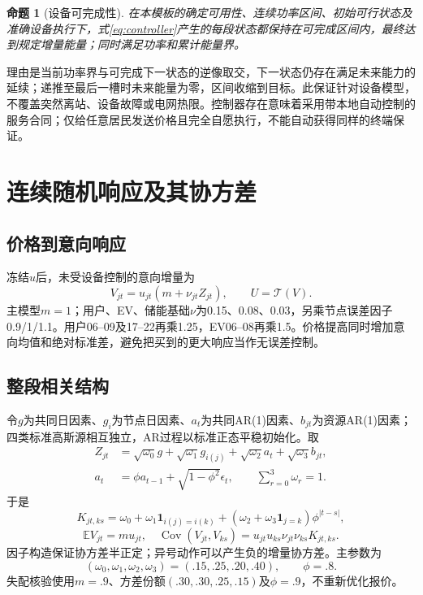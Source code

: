 \documentclass[UTF8,a4paper,11pt]{ctexart}
\newcommand{\E}{\mathbb E}\newcommand{\Prb}{\mathbb P}\newcommand{\R}{\mathbb R}
\newcommand{\Tcal}{\mathcal T}\newcommand{\ind}{\mathbf 1}
\newtheorem{proposition}{命题}
\begin{document}
\begin{proposition}[设备可完成性]
在本模板的确定可用性、连续功率区间、初始可行状态及准确设备执行下，式\eqref{eq:controller}产生的每段状态都保持在可完成区间内，最终达到规定增量能量；同时满足功率和累计能量界。
\end{proposition}
理由是当前功率界与可完成下一状态的逆像取交，下一状态仍存在满足未来能力的延续；递推至最后一槽时未来能量为零，区间收缩到目标。此保证针对设备模型，不覆盖突然离站、设备故障或电网热限。控制器存在意味着采用带本地自动控制的服务合同；仅给任意居民发送价格且完全自愿执行，不能自动获得同样的终端保证。

\section{连续随机响应及其协方差}
\subsection{价格到意向响应}
冻结$u$后，未受设备控制的意向增量为
\begin{equation}
 V_{jt}=u_{jt}(m+\nu_{jt}Z_{jt}),\qquad
 U=\Tcal(V).\label{eq:response}
\end{equation}
主模型$m=1$；用户、EV、储能基础$\nu$为0.15、0.08、0.03，另乘节点误差因子0.9/1/1.1。用户06--09及17--22再乘1.25，EV06--08再乘1.5。价格提高同时增加意向均值和绝对标准差，避免把买到的更大响应当作无误差控制。

\subsection{整段相关结构}
令$g$为共同日因素、$g_i$为节点日因素、$a_t$为共同AR(1)因素、$b_{jt}$为资源AR(1)因素；四类标准高斯源相互独立，AR过程以标准正态平稳初始化。取
\begin{align}
 Z_{jt}&=\sqrt{\omega_0}g+\sqrt{\omega_1}g_{i(j)}+\sqrt{\omega_2}a_t+\sqrt{\omega_3}b_{jt},\\
 a_t&=\phi a_{t-1}+\sqrt{1-\phi^2}\epsilon_t,
 \qquad\sum_{r=0}^{3}\omega_r=1.
\end{align}
于是
\begin{equation}
 K_{jt,ks}=\omega_0+\omega_1\ind_{i(j)=i(k)}+
 (\omega_2+\omega_3\ind_{j=k})\phi^{|t-s|},\label{eq:cov}
\end{equation}
\begin{equation}
 \E V_{jt}=mu_{jt},\quad
 \operatorname{Cov}(V_{jt},V_{ks})=u_{jt}u_{ks}\nu_{jt}\nu_{ks}K_{jt,ks}.
\end{equation}
因子构造保证协方差半正定；异号动作可以产生负的增量协方差。主参数为
\begin{equation*}(\omega_0,\omega_1,\omega_2,\omega_3)=(.15,.25,.20,.40),\qquad\phi=.8.\end{equation*}
失配核验使用$m=.9$、方差份额$(.30,.30,.25,.15)$及$\phi=.9$，不重新优化报价。
\end{document}
